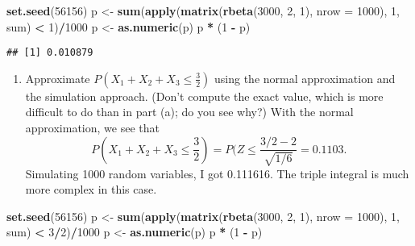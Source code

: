 \documentclass[12pt,]{article}
\newenvironment{Shaded}{\begin{snugshade}}{\end{snugshade}}
\newcommand{\DataTypeTok}[1]{\textcolor[rgb]{0.13,0.29,0.53}{#1}}
\newcommand{\DecValTok}[1]{\textcolor[rgb]{0.00,0.00,0.81}{#1}}
\newcommand{\KeywordTok}[1]{\textcolor[rgb]{0.13,0.29,0.53}{\textbf{#1}}}
\newcommand{\NormalTok}[1]{#1}
\newcommand{\OperatorTok}[1]{\textcolor[rgb]{0.81,0.36,0.00}{\textbf{#1}}}
\newcommand{\StringTok}[1]{\textcolor[rgb]{0.31,0.60,0.02}{#1}}
\providecommand{\tightlist}{%
  \setlength{\itemsep}{0pt}\setlength{\parskip}{0pt}}
\begin{document}
\begin{Shaded}
\begin{Highlighting}[]
\KeywordTok{set.seed}\NormalTok{(}\DecValTok{56156}\NormalTok{)}
\NormalTok{p <-}\StringTok{ }\KeywordTok{sum}\NormalTok{(}\KeywordTok{apply}\NormalTok{(}\KeywordTok{matrix}\NormalTok{(}\KeywordTok{rbeta}\NormalTok{(}\DecValTok{3000}\NormalTok{, }\DecValTok{2}\NormalTok{, }\DecValTok{1}\NormalTok{), }\DataTypeTok{nrow =} \DecValTok{1000}\NormalTok{), }
    \DecValTok{1}\NormalTok{, sum) }\OperatorTok{<}\StringTok{ }\DecValTok{1}\NormalTok{)}\OperatorTok{/}\DecValTok{1000}
\NormalTok{p <-}\StringTok{ }\KeywordTok{as.numeric}\NormalTok{(p)}
\NormalTok{p }\OperatorTok{*}\StringTok{ }\NormalTok{(}\DecValTok{1} \OperatorTok{-}\StringTok{ }\NormalTok{p)}
\end{Highlighting}
\end{Shaded}

\begin{verbatim}
## [1] 0.010879
\end{verbatim}

\begin{enumerate}
\def\labelenumi{(\alph{enumi})}
\setcounter{enumi}{3}
\tightlist
\item
  Approximate \(P\left( X_1 + X_2 + X_3 \le \frac{3}{2} \right)\) using
  the normal approximation and the simulation approach. (Don't compute
  the exact value, which is more difficult to do than in part (a); do
  you see why?) With the normal approximation, we see that
  \[P\left( X_1 + X_2 + X_3 \le \frac{3}{2} \right)=P(Z\le \frac{3/2 - 2}{\sqrt{1/6}}=0.1103.\]
  Simulating 1000 random variables, I got 0.111616. The triple integral
  is much more complex in this case.
\end{enumerate}

\begin{Shaded}
\begin{Highlighting}[]
\KeywordTok{set.seed}\NormalTok{(}\DecValTok{56156}\NormalTok{)}
\NormalTok{p <-}\StringTok{ }\KeywordTok{sum}\NormalTok{(}\KeywordTok{apply}\NormalTok{(}\KeywordTok{matrix}\NormalTok{(}\KeywordTok{rbeta}\NormalTok{(}\DecValTok{3000}\NormalTok{, }\DecValTok{2}\NormalTok{, }\DecValTok{1}\NormalTok{), }\DataTypeTok{nrow =} \DecValTok{1000}\NormalTok{), }
    \DecValTok{1}\NormalTok{, sum) }\OperatorTok{<}\StringTok{ }\DecValTok{3}\OperatorTok{/}\DecValTok{2}\NormalTok{)}\OperatorTok{/}\DecValTok{1000}
\NormalTok{p <-}\StringTok{ }\KeywordTok{as.numeric}\NormalTok{(p)}
\NormalTok{p }\OperatorTok{*}\StringTok{ }\NormalTok{(}\DecValTok{1} \OperatorTok{-}\StringTok{ }\NormalTok{p)}
\end{Highlighting}
\end{Shaded}
\end{document}
